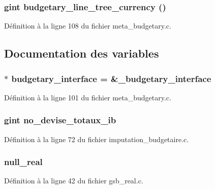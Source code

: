 \subsubsection[{budgetary\_\-line\_\-tree\_\-currency}]{\setlength{\rightskip}{0pt plus 5cm}gint budgetary\_\-line\_\-tree\_\-currency ()}\label{meta__budgetary_8c_a646da781949900e101ad620ddc693a38}


Définition à la ligne 108 du fichier meta\_\-budgetary.c.



\subsection{Documentation des variables}
\subsubsection[{budgetary\_\-interface}]{$\ast$ {\bf budgetary\_\-interface} = \&\_\-budgetary\_\-interface}\label{meta__budgetary_8c_a4b1a6befee9f0036849fd2ad597c7b13}


Définition à la ligne 101 du fichier meta\_\-budgetary.c.

\subsubsection[{no\_\-devise\_\-totaux\_\-ib}]{\setlength{\rightskip}{0pt plus 5cm}gint {\bf no\_\-devise\_\-totaux\_\-ib}}\label{meta__budgetary_8c_a2f4b5073521c582e1bc8941533026556}


Définition à la ligne 72 du fichier imputation\_\-budgetaire.c.

\subsubsection[{null\_\-real}]{ {\bf null\_\-real}}\label{meta__budgetary_8c_a26f304bec3fdc0651b9aa8765d4de3c6}


Définition à la ligne 42 du fichier gsb\_\-real.c.

